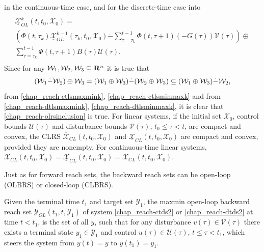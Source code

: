 \documentclass[letterpaper,10pt,english]{sphinxmanual}
\begin{document}
in the continuous-time case, and for the discrete-time case into
\label{chap_reach:equation-dtlsminmaxk}\begin{gather}
\begin{split}\begin{array}{l}
\underline{{\mathcal X}}_{OL}^k(t, t_0, {\mathcal X}_0) = \\
\left(\Phi(t, \tau_k)\underline{{\mathcal X}}_{OL}^{k-1}(\tau_k, t_0, {\mathcal X}_0) \dot{-}
\sum_{\tau=\tau_k}^{t-1}\Phi(t, \tau+1)(-G(\tau)){\mathcal V}(\tau)\right)
\oplus \\
\sum_{\tau=\tau_k}^{t-1}\Phi(t, \tau+1)B(\tau){\mathcal U}(\tau).
\end{array}\end{split}\label{chap_reach-dtlsminmaxk}
\end{gather}
Since for any
${\mathcal W}_1, {\mathcal W}_2, {\mathcal W}_3 \subseteq {\bf R}^n$
it is true that
\begin{gather}
\begin{split}({\mathcal W}_1 \dot{-} {\mathcal W}_2) \oplus {\mathcal W}_3 =
({\mathcal W}_1 \oplus {\mathcal W}_3) \dot{-} ({\mathcal W}_2 \oplus {\mathcal W}_3) \subseteq
({\mathcal W}_1 \oplus {\mathcal W}_3) \dot{-} {\mathcal W}_2,\end{split}\notag
\end{gather}
from \eqref{chap_reach-ctlsmaxmink}, \eqref{chap_reach-ctlsminmaxk} and from \eqref{chap_reach-dtlsmaxmink},
\eqref{chap_reach-dtlsminmaxk}, it is clear that \eqref{chap_reach-olrsinclusion} is true.
For linear systems, if the initial set ${\mathcal X}_0$, control
bounds ${\mathcal U}(\tau)$ and disturbance bounds
${\mathcal V}(\tau)$, $t_0\leqslant\tau<t$, are compact and
convex, the CLRS
$\overline{{\mathcal X}}_{CL}(t, t_0, {\mathcal X}_0)$ and
$\underline{{\mathcal X}}_{CL}(t, t_0, {\mathcal X}_0)$ are
compact and convex, provided they are nonempty. For continuous-time
linear systems,
$\overline{{\mathcal X}}_{CL}(t, t_0, {\mathcal X}_0) = \underline{{\mathcal X}}_{CL}(t, t_0, {\mathcal X}_0) = {\mathcal X}_{CL}(t, t_0, {\mathcal X}_0)$.

Just as for forward reach sets, the backward reach sets can be open-loop
(OLBRS) or closed-loop (CLBRS).

Given the terminal time $t_1$ and target set
${\mathcal Y}_1$, the maxmin open-loop backward reach set
$\overline{{\mathcal Y}}_{OL}(t_1, t, {\mathcal Y}_1)$ of system
\eqref{chap_reach-ctds2} or \eqref{chap_reach-dtds2} at time $t<t_1$, is the set of all $y$,
such that for any disturbance $v(\tau)\in{\mathcal V}(\tau)$ there
exists a terminal state $y_1\in{\mathcal Y}_1$ and control
$u(\tau)\in{\mathcal U}(\tau)$, $t\leqslant\tau<t_1$, which
steers the system from $y(t)=y$ to $y(t_1)=y_1$.
\end{document}
